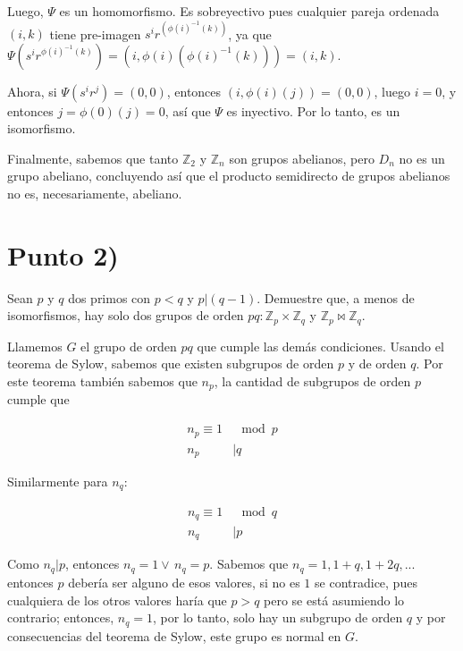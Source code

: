 \documentclass{article}
\begin{document}
      Luego, $\Psi$ es un homomorfismo. Es sobreyectivo pues cualquier pareja ordenada $(i, k)$ 
      tiene pre-imagen $s^i r^{(\phi(i)^{-1}(k))}$, ya que 
      $\Psi(s^i r^{\phi(i)^{-1}(k)}) = (i, \phi(i)(\phi(i)^{-1}(k))) = (i, k)$.

      Ahora, si $\Psi(s^i r^j) = (0, 0)$, entonces $(i, \phi(i)(j)) = (0, 0)$, luego $i = 0$, y 
      entonces $j = \phi(0)(j) = 0$, así que $\Psi$ es inyectivo. Por lo tanto, es un isomorfismo.

      Finalmente, sabemos que tanto $\mathbb{Z}_2$ y $\mathbb{Z}_n$ son grupos abelianos, pero $D_n$ no 
      es un grupo abeliano, concluyendo así que el producto semidirecto de grupos abelianos no es, necesariamente, 
      abeliano.

  \section{Punto 2)}
    Sean $p$ y $q$ dos primos con $p < q$ y $p|(q - 1)$. Demuestre que, a menos de isomorfismos, hay solo dos 
    grupos de orden $pq: \mathbb{Z}_p \times \mathbb{Z}_q$ y $\mathbb{Z}_p \Join \mathbb{Z}_q$.

    Llamemos $G$ el grupo de orden $pq$ que cumple las demás condiciones.
    Usando el teorema de Sylow, sabemos que existen subgrupos de orden $p$ y de orden $q$. Por este teorema 
    también sabemos que $n_p$, la cantidad de subgrupos de orden $p$ cumple que 

    \begin{equation*}
      \begin{aligned}
        n_p \equiv 1 &\mod p \\
        n_p &| q
      \end{aligned}
    \end{equation*}

    Similarmente para $n_q$:

    \begin{equation*}
      \begin{aligned}
        n_q \equiv 1 &\mod q \\
        n_q &| p
      \end{aligned}
    \end{equation*}

    Como $n_q | p$, entonces $n_q = 1 \lor\, n_q = p$. Sabemos que 
    $n_q = 1, 1 + q, 1 + 2q, ...$ entonces $p$ debería ser alguno de esos valores, si no es $1$
    se contradice, pues cualquiera de los otros valores haría que $p > q$ pero se está asumiendo 
    lo contrario; entonces, $n_q = 1$, por lo tanto, solo hay un subgrupo de orden $q$ y por 
    consecuencias del teorema de Sylow, este grupo es normal en $G$.
\end{document}
